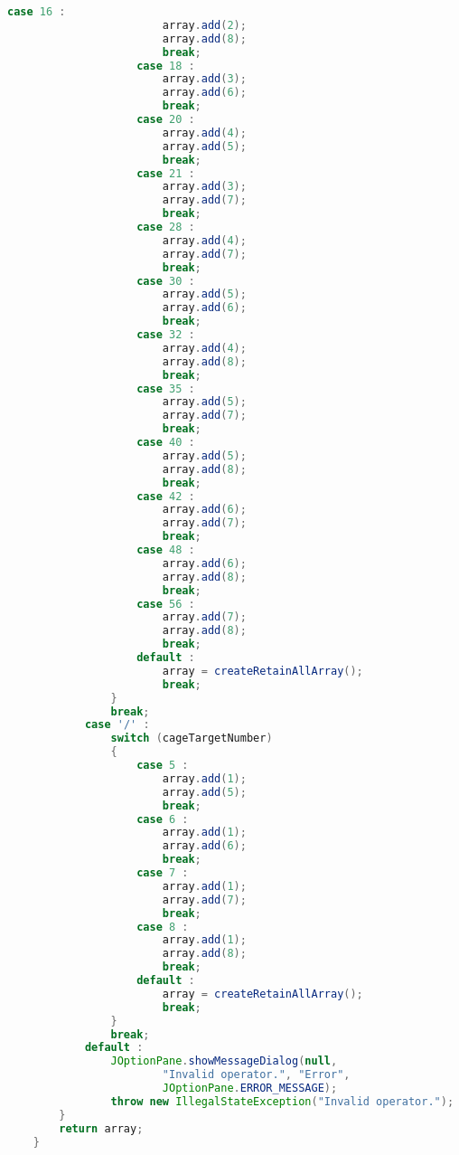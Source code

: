 \begin{lstlisting}[language=Java,basicstyle=\tiny,caption=SolverRuleBased.java]
                    case 16 :
                        array.add(2);
                        array.add(8);
                        break;
                    case 18 :
                        array.add(3);
                        array.add(6);
                        break;
                    case 20 :
                        array.add(4);
                        array.add(5);
                        break;
                    case 21 :
                        array.add(3);
                        array.add(7);
                        break;
                    case 28 :
                        array.add(4);
                        array.add(7);
                        break;
                    case 30 :
                        array.add(5);
                        array.add(6);
                        break;
                    case 32 :
                        array.add(4);
                        array.add(8);
                        break;
                    case 35 :
                        array.add(5);
                        array.add(7);
                        break;
                    case 40 :
                        array.add(5);
                        array.add(8);
                        break;
                    case 42 :
                        array.add(6);
                        array.add(7);
                        break;
                    case 48 :
                        array.add(6);
                        array.add(8);
                        break;
                    case 56 :
                        array.add(7);
                        array.add(8);
                        break;
                    default :
                        array = createRetainAllArray();
                        break;
                }
                break;
            case '/' :
                switch (cageTargetNumber)
                {
                    case 5 :
                        array.add(1);
                        array.add(5);
                        break;
                    case 6 :
                        array.add(1);
                        array.add(6);
                        break;
                    case 7 :
                        array.add(1);
                        array.add(7);
                        break;
                    case 8 :
                        array.add(1);
                        array.add(8);
                        break;
                    default :
                        array = createRetainAllArray();
                        break;
                }
                break;
            default :
                JOptionPane.showMessageDialog(null, 
                        "Invalid operator.", "Error", 
                        JOptionPane.ERROR_MESSAGE);
                throw new IllegalStateException("Invalid operator.");
        }
        return array;
    }
    

\end{lstlisting}

